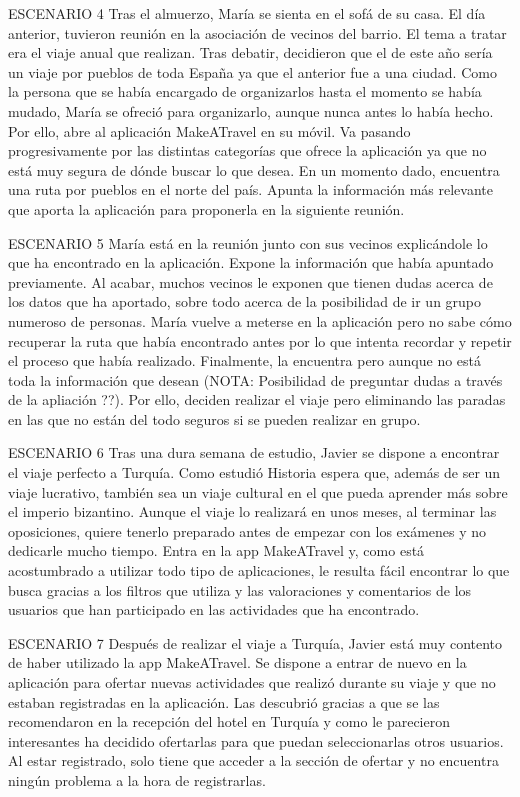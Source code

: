 \documentclass[11pt]{article}
\begin{document}
ESCENARIO 4
Tras el almuerzo, María se sienta en el sofá de su casa. El día anterior, tuvieron reunión en la asociación de vecinos del barrio. El tema a tratar era el viaje anual que realizan. Tras debatir, decidieron que el de este año sería un viaje por pueblos de toda España ya que el anterior fue a una ciudad. Como la persona que se había encargado de organizarlos hasta el momento se había mudado, María se ofreció para organizarlo, aunque nunca antes lo había hecho. Por ello, abre al aplicación MakeATravel en su móvil. Va pasando progresivamente por las distintas categorías que ofrece la aplicación ya que no está muy segura de dónde buscar lo que desea. En un momento dado, encuentra una ruta por pueblos en el norte del país. Apunta la información más relevante que aporta la aplicación para proponerla en la siguiente reunión. 

ESCENARIO 5
María está en la reunión junto con sus vecinos explicándole lo que ha encontrado en la aplicación. Expone la información que había apuntado previamente. Al acabar, muchos vecinos le exponen que tienen dudas acerca de los datos que ha aportado, sobre todo acerca de la posibilidad de ir un grupo numeroso de personas. María vuelve a meterse en la aplicación pero no sabe cómo recuperar la ruta que había encontrado antes por lo que intenta recordar y repetir el proceso que había realizado. Finalmente, la encuentra pero aunque no está toda la información que desean (NOTA: Posibilidad de preguntar dudas a través de la apliación ??). Por ello, deciden realizar el viaje pero eliminando las paradas en las que no están del todo seguros si se pueden realizar en grupo.

ESCENARIO 6
Tras una dura semana de estudio, Javier se dispone a encontrar el viaje perfecto a Turquía. Como estudió Historia espera que, además de ser un viaje lucrativo, también sea un viaje cultural en el que pueda aprender más sobre el imperio bizantino. Aunque el viaje lo realizará en unos meses, al terminar las oposiciones, quiere tenerlo preparado antes de empezar con los exámenes y no dedicarle mucho tiempo. Entra en la app MakeATravel y, como está acostumbrado a utilizar todo tipo de aplicaciones, le resulta fácil encontrar lo que busca gracias a los filtros que utiliza y las valoraciones y comentarios de los usuarios que han participado en las actividades que ha encontrado.

ESCENARIO 7
Después de realizar el viaje a Turquía, Javier está muy contento de haber utilizado la app MakeATravel. Se dispone a entrar de nuevo en la aplicación para ofertar nuevas actividades que realizó durante su viaje y que no estaban registradas en la aplicación. Las descubrió gracias a que se las recomendaron en la recepción del hotel en Turquía y como le parecieron interesantes ha decidido ofertarlas para que puedan seleccionarlas otros usuarios. Al estar registrado, solo tiene que acceder a la sección de ofertar y no encuentra ningún problema a la hora de registrarlas.
\end{document}
